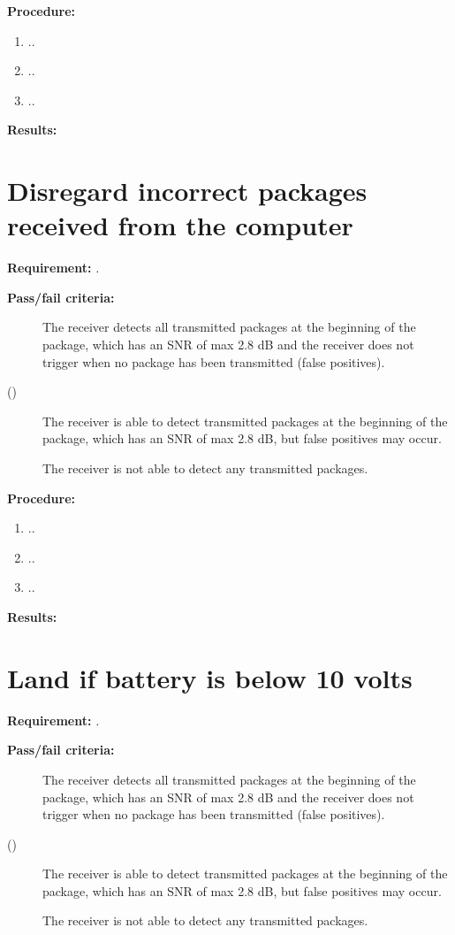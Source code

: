 		
\textbf{Procedure:}\\


\begin{enumerate}
	\item ..
	\item ..
	\item ..
\end{enumerate} 

\textbf{Results:}

\newpage

\section{Disregard incorrect packages received from the computer}
\textbf{Requirement: }
\textit{.}

\textbf{Pass/fail criteria:}
	\begin{description}
	\item[  ] The receiver detects all transmitted packages at the beginning of the package, which has an SNR of max 2.8 dB and the receiver does not trigger when no package has been transmitted (false positives).
	\item[()]The receiver is able to detect transmitted packages at the beginning of the package, which has an SNR of max 2.8 dB, but false positives may occur.
	\item[  \phantom{)}]The receiver is not able to detect any transmitted packages.
	\end{description}

		
\textbf{Procedure:}\\


\begin{enumerate}
	\item ..
	\item ..
	\item ..
\end{enumerate} 


\textbf{Results:}


\newpage

\section{Land if battery is below 10 volts}
\textbf{Requirement: }
\textit{.}

\textbf{Pass/fail criteria:}
	\begin{description}
	\item[  ] The receiver detects all transmitted packages at the beginning of the package, which has an SNR of max 2.8 dB and the receiver does not trigger when no package has been transmitted (false positives).
	\item[()]The receiver is able to detect transmitted packages at the beginning of the package, which has an SNR of max 2.8 dB, but false positives may occur.
	\item[  \phantom{)}]The receiver is not able to detect any transmitted packages.
	\end{description}

